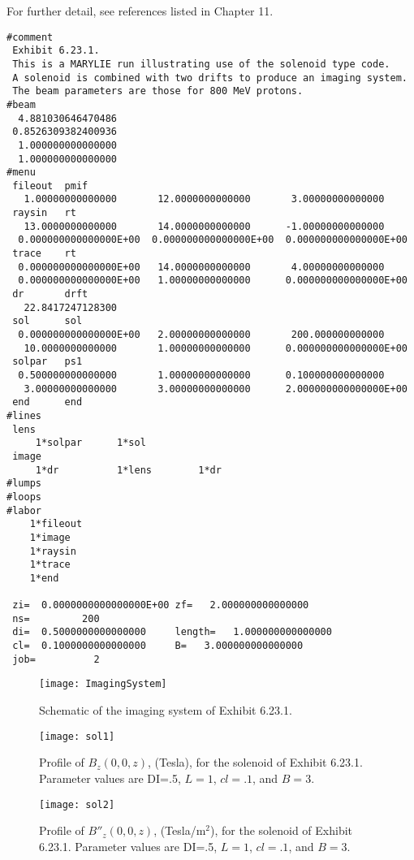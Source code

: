 For further detail, see references listed in Chapter 11.

\newpage

\begin{footnotesize}
\begin{verbatim}
#comment
 Exhibit 6.23.1.
 This is a MARYLIE run illustrating use of the solenoid type code.
 A solenoid is combined with two drifts to produce an imaging system.
 The beam parameters are those for 800 MeV protons.
#beam
  4.881030646470486
 0.8526309382400936
  1.000000000000000
  1.000000000000000
#menu
 fileout  pmif
   1.00000000000000       12.0000000000000       3.00000000000000
 raysin   rt
   13.0000000000000       14.0000000000000      -1.00000000000000
  0.000000000000000E+00  0.000000000000000E+00  0.000000000000000E+00
 trace    rt
  0.000000000000000E+00   14.0000000000000       4.00000000000000
  0.000000000000000E+00   1.00000000000000      0.000000000000000E+00
 dr       drft
   22.8417247128300
 sol      sol
  0.000000000000000E+00   2.00000000000000       200.000000000000
   10.0000000000000       1.00000000000000      0.000000000000000E+00
 solpar   ps1
  0.500000000000000       1.00000000000000      0.100000000000000
   3.00000000000000       3.00000000000000      2.000000000000000E+00
 end      end
#lines
 lens
     1*solpar      1*sol
 image
     1*dr          1*lens        1*dr
#lumps
#loops
#labor
    1*fileout
    1*image
    1*raysin
    1*trace
    1*end

 zi=  0.0000000000000000E+00 zf=   2.000000000000000
 ns=         200
 di=  0.5000000000000000     length=   1.000000000000000
 cl=  0.1000000000000000     B=   3.000000000000000
 job=          2
\end{verbatim}
\end{footnotesize}

\newpage

\begin{figure}[p]
  \centering
  \texttt{[image: ImagingSystem]}
  \caption{Schematic of the imaging system of Exhibit 6.23.1.}
\end{figure}

\clearpage

\begin{figure}[p]
  \centering
  \texttt{[image: sol1]}
  \caption{Profile of $B_z(0,0,z)$, (Tesla), for the solenoid of Exhibit 6.23.1.  Parameter values are DI=.5, $L=1$, $cl=.1$, and $B=3$.}
\end{figure}

\begin{figure}[p]
  \centering
  \texttt{[image: sol2]}
  \caption{Profile of $B''_z(0,0,z)$, (Tesla/m$^2$), for the solenoid of Exhibit 6.23.1.  Parameter values are DI=.5, $L=1$, $cl=.1$, and $B=3$.}
\end{figure}

